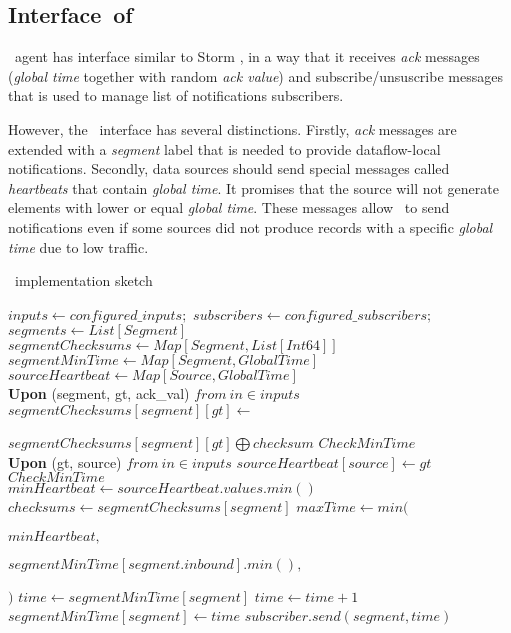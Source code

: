 \subsection{Interface\ of\ \tracker\ }
\tracker\ agent has interface similar to Storm \acker, in a way that it receives \textit{ack} messages (\textit{global time} together with random \textit{ack value}) and subscribe/unsuscribe messages that is used to manage list of notifications subscribers. 

However, the \tracker\  interface has several distinctions. Firstly, \textit{ack} messages are extended with a \textit{segment} label that is needed to provide dataflow-local notifications. Secondly, data sources should send special messages called \textit{heartbeats} that contain \textit{global time}. It promises that the source will not generate elements with lower or equal \textit{global time}. These messages allow \tracker\ to send notifications even if some sources did not produce records with a specific \textit{global time} due to low traffic. 

\begin{algorithm}
\caption{\tracker\ implementation sketch}
\label{tracker_algo}
\begin{algorithmic}[1]
\State $inputs \leftarrow configured\_inputs;$ 
\State $subscribers \leftarrow configured\_subscribers;$
\State $segments \leftarrow List[Segment]$
\State $segmentChecksums \leftarrow Map[Segment, List[Int64]]$
\State $segmentMinTime \leftarrow Map[Segment, GlobalTime]$
\State $sourceHeartbeat \leftarrow Map[Source, GlobalTime]$
\\
\State \textbf{Upon} (segment, gt, ack\_val) $from \ in\in inputs$
\Indent
    \State $segmentChecksums[segment][gt] \gets $
    \par\Indent\Indent$segmentChecksums[segment][gt] \bigoplus checksum$\EndIndent\EndIndent
    \State $CheckMinTime$
\EndIndent
\\
\State \textbf{Upon} (gt, source) $from \ in\in inputs$
\Indent
 \State $sourceHeartbeat[source] \leftarrow gt$
 \State $CheckMinTime$
\EndIndent
\\
\State $minHeartbeat \leftarrow sourceHeartbeat.values.min()$
\State $checksums \gets segmentChecksums[segment]$
\State $maxTime \gets min($
\par\Indent\Indent$minHeartbeat,$\EndIndent\EndIndent
\par\Indent\Indent$segmentMinTime[segment.inbound].min(),$\EndIndent\EndIndent
\par\Indent$)$\EndIndent
\State $time \gets segmentMinTime[segment]$
\State $time \gets time + 1$
\EndWhile
{}
\State $segmentMinTime[segment] \gets time$
\State $subscriber.send(segment, time)$
\EndFor
\EndIf
\EndFor
\EndProcedure
\end{algorithmic}
\end{algorithm}


